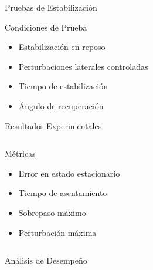 \documentclass[10pt,xcolor={dvipsnames}]{beamer}
\begin{document}
\begin{frame}{Pruebas de Estabilización}
\begin{block}{Condiciones de Prueba}
\begin{itemize}
    \item Estabilización en reposo
    \item Perturbaciones laterales controladas
    \item Tiempo de estabilización
    \item Ángulo de recuperación
\end{itemize}
\end{block}

\vspace{0.3cm}
\begin{center}
\end{center}
\end{frame}

\begin{frame}{Resultados Experimentales}
\begin{center}
\end{center}

\vspace{0.3cm}
\begin{columns}
\begin{block}{Métricas}
\begin{itemize}
    \item Error en estado estacionario
    \item Tiempo de asentamiento
    \item Sobrepaso máximo
    \item Perturbación máxima
\end{itemize}
\end{block}

\end{columns}
\end{frame}

\begin{frame}{Análisis de Desempeño}
\begin{center}
\end{center}

\vspace{0.3cm}
\begin{columns}

\end{columns}
\end{frame}
\end{document}
